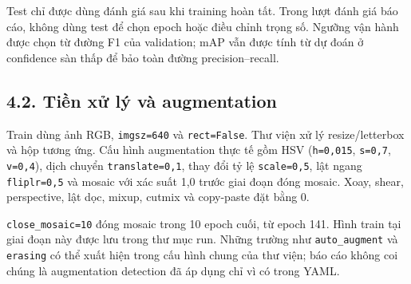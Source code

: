 \documentclass[
  vietnamese,
  12pt,
  a4paper,
]{article}
\begin{document}
Test chỉ được dùng đánh giá sau khi training hoàn tất. Trong lượt đánh
giá báo cáo, không dùng test để chọn epoch hoặc điều chỉnh trọng số.
Ngưỡng vận hành được chọn từ đường F1 của validation; mAP vẫn được tính
từ dự đoán ở confidence sàn thấp để bảo toàn đường precision--recall.

\subsection{4.2. Tiền xử lý và
augmentation}\label{tiux1ec1n-xux1eed-luxfd-vuxe0-augmentation}

Train dùng ảnh RGB,
\texttt{i\allowbreak{}m\allowbreak{}g\allowbreak{}s\allowbreak{}z\allowbreak{}=\allowbreak{}6\allowbreak{}4\allowbreak{}0\allowbreak{}}
và
\texttt{r\allowbreak{}e\allowbreak{}c\allowbreak{}t\allowbreak{}=\allowbreak{}F\allowbreak{}a\allowbreak{}l\allowbreak{}s\allowbreak{}e\allowbreak{}}.
Thư viện xử lý resize/letterbox và hộp tương ứng. Cấu hình augmentation
thực tế gồm HSV
(\texttt{h\allowbreak{}=\allowbreak{}0\allowbreak{},\allowbreak{}0\allowbreak{}1\allowbreak{}5\allowbreak{}},
\texttt{s\allowbreak{}=\allowbreak{}0\allowbreak{},\allowbreak{}7\allowbreak{}},
\texttt{v\allowbreak{}=\allowbreak{}0\allowbreak{},\allowbreak{}4\allowbreak{}}),
dịch chuyển
\texttt{t\allowbreak{}r\allowbreak{}a\allowbreak{}n\allowbreak{}s\allowbreak{}l\allowbreak{}a\allowbreak{}t\allowbreak{}e\allowbreak{}=\allowbreak{}0\allowbreak{},\allowbreak{}1\allowbreak{}},
thay đổi tỷ lệ
\texttt{s\allowbreak{}c\allowbreak{}a\allowbreak{}l\allowbreak{}e\allowbreak{}=\allowbreak{}0\allowbreak{},\allowbreak{}5\allowbreak{}},
lật ngang
\texttt{f\allowbreak{}l\allowbreak{}i\allowbreak{}p\allowbreak{}l\allowbreak{}r\allowbreak{}=\allowbreak{}0\allowbreak{},\allowbreak{}5\allowbreak{}}
và mosaic với xác suất 1,0 trước giai đoạn đóng mosaic. Xoay, shear,
perspective, lật dọc, mixup, cutmix và copy-paste đặt bằng 0.

\texttt{c\allowbreak{}l\allowbreak{}o\allowbreak{}s\allowbreak{}e\allowbreak{}\_\allowbreak{}m\allowbreak{}o\allowbreak{}s\allowbreak{}a\allowbreak{}i\allowbreak{}c\allowbreak{}=\allowbreak{}1\allowbreak{}0\allowbreak{}}
đóng mosaic trong 10 epoch cuối, từ epoch 141. Hình train tại giai đoạn
này được lưu trong thư mục run. Những trường như
\texttt{a\allowbreak{}u\allowbreak{}t\allowbreak{}o\allowbreak{}\_\allowbreak{}a\allowbreak{}u\allowbreak{}g\allowbreak{}m\allowbreak{}e\allowbreak{}n\allowbreak{}t\allowbreak{}}
và
\texttt{e\allowbreak{}r\allowbreak{}a\allowbreak{}s\allowbreak{}i\allowbreak{}n\allowbreak{}g\allowbreak{}}
có thể xuất hiện trong cấu hình chung của thư viện; báo cáo không coi
chúng là augmentation detection đã áp dụng chỉ vì có trong YAML.
\end{document}
